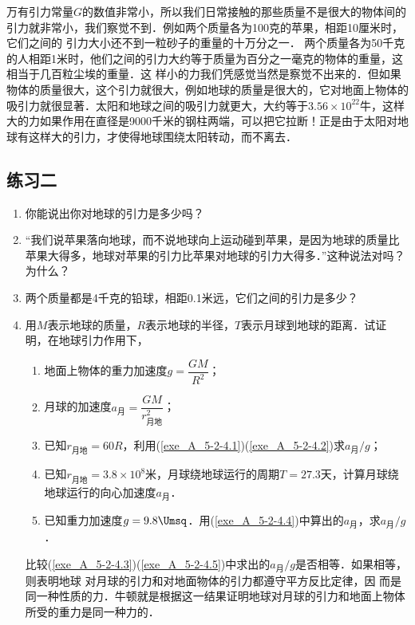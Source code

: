 万有引力常量$G$的数值非常小，所以我们日常接触的那些质量不是很大的物体间的引力就非常小，我们察觉不到．例如两个质量各为100克的苹果，相距10厘米时，它们之间的
引力大小还不到一粒砂子的重量的十万分之一．
两个质量各为50千克的人相距1米时，他们之间的引力大约等于质量为百分之一毫克的物体的重量，这相当于几百粒尘埃的重量．这
样小的力我们凭感觉当然是察觉不出来的．但如果物体的质量很大，这个引力就很大，例如地球的质量是很大的，它对地面上物体的吸引力就很显著．太阳和地球之间的吸引力就更大，大约等于$3.56\times 10^{22}$牛，这样大的力如果作用在直径是9000千米的钢柱两端，可以把它拉断！正是由于太阳对地球有这样大的引力，才使得地球围绕太阳转动，而不离去．

\subsection*{练习二}
\begin{enumerate}
	\item 你能说出你对地球的引力是多少吗？
\item “我们说苹果落向地球，而不说地球向上运动碰到苹果，是因为地球的质量比苹果大得多，地球对苹果的引力比苹果对地球的引力大得多．”这种说法对吗？为什么？
\item 两个质量都是4千克的铅球，相距0.1米远，它们之间的引力是多少？
\item 用$M$表示地球的质量，$R$表示地球的半径，$T$表示月球到地球的距离．试证明，在地球引力作用下，
\begin{enumerate}
	\item \label{exe_A_5-2-4.1} 
	 地面上物体的重力加速度$g=\dfrac{GM}{R^2}$；
	\item \label{exe_A_5-2-4.2}
	月球的加速度$a_{\text{月}}=\dfrac{GM}{r^2_{\text{月地}}}$；
	\item \label{exe_A_5-2-4.3}
	 已知$r_{\text{月地}}=60R$，利用(\ref{exe_A_5-2-4.1})(\ref{exe_A_5-2-4.2})求$a_{\text{月}}/g$；
	\item \label{exe_A_5-2-4.4} 
	已知$r_{\text{月地}}=3.8\times 10^8$米，月球绕地球运行的周期$T=27.3$天，计算月球绕地球运行的向心加速度$a_{\text{月}}$．
	\item \label{exe_A_5-2-4.5} 
	 已知重力加速度$g=9.8\Umsq$．用(\ref{exe_A_5-2-4.4})中算出的$a_{\text{月}}$，求$a_{\text{月}}/g$．
	

\end{enumerate}
比较(\ref{exe_A_5-2-4.3})(\ref{exe_A_5-2-4.5})中求出的$a_{\text{月}}/g$是否相等．如果相等，则表明地球
对月球的引力和对地面物体的引力都遵守平方反比定律，因
而是同一种性质的力．牛顿就是根据这一结果证明地球对月球的引力和地面上物体所受的重力是同一种力的．
\end{enumerate}


